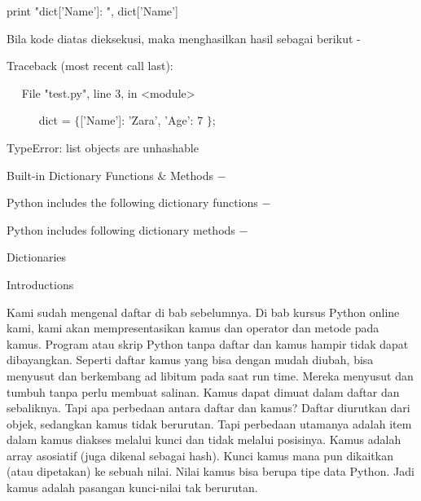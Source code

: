 \vspace{12pt}
\noindent 
 \hspace*{0.5in} print "dict['Name']: ", dict['Name'] \par
\noindent 
Bila kode diatas dieksekusi, maka menghasilkan hasil sebagai berikut - \par
\noindent 
 \hspace*{0.5in} Traceback (most recent call last): \par
\noindent 
~~  \hspace*{0.5in}  \hspace*{0.5in} File "test.py", line 3, in <module> \par
\noindent 
~~~~~  \hspace*{0.5in}  \hspace*{0.5in} dict =  $  \{  $['Name']: 'Zara', 'Age': 7 $  \}  $; \par
\noindent 
 \hspace*{0.5in} TypeError: list objects are unhashable \par
\vspace{12pt}
\vspace{12pt}
\vspace{12pt}
\noindent 
Built-in Dictionary Functions  $  \&  $ Methods  $ - $ \par
\noindent 
Python includes the following dictionary functions  $ - $ \par
\noindent 
Python includes following dictionary methods  $ - $ \par
\vspace{12pt}
\vspace{12pt}
\vspace{12pt}
\noindent 
Dictionaries \par
\vspace{12pt}
\noindent 
Introductions \par
\noindent 
Kami sudah mengenal daftar di bab sebelumnya. Di bab kursus Python online kami, kami akan mempresentasikan kamus dan operator dan metode pada kamus. Program atau skrip Python tanpa daftar dan kamus hampir tidak dapat dibayangkan. Seperti daftar kamus yang bisa dengan mudah diubah, bisa menyusut dan berkembang ad libitum pada saat run time. Mereka menyusut dan tumbuh tanpa perlu membuat salinan. Kamus dapat dimuat dalam daftar dan sebaliknya. Tapi apa perbedaan antara daftar dan kamus? Daftar diurutkan dari objek, sedangkan kamus tidak berurutan. Tapi perbedaan utamanya adalah item dalam kamus diakses melalui kunci dan tidak melalui posisinya. Kamus adalah array asosiatif (juga dikenal sebagai hash). Kunci kamus mana pun dikaitkan (atau dipetakan) ke sebuah nilai. Nilai kamus bisa berupa tipe data Python. Jadi kamus adalah pasangan kunci-nilai tak berurutan. \par

